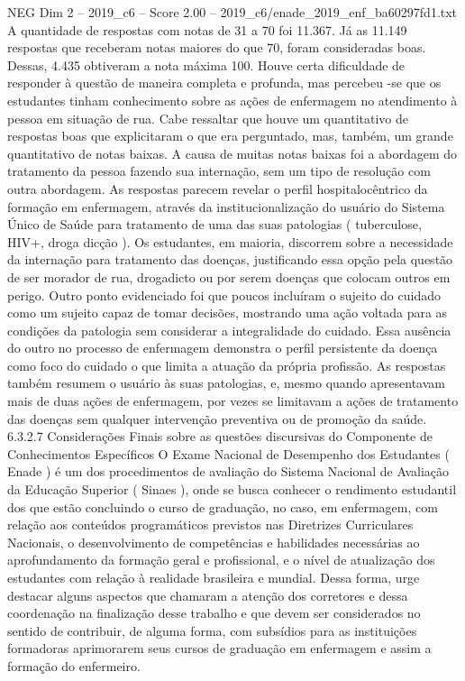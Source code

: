 \begin{textsample}{NEG Dim 2 – 2019\_c6 – Score 2.00 – 2019\_c6/enade\_2019\_enf\_ba60297fd1.txt}
A quantidade de respostas com notas de 31 a 70 foi 11.367.
Já as 11.149 respostas que receberam notas maiores do que 70, foram consideradas boas.
Dessas, 4.435 obtiveram a nota máxima 100.
Houve certa dificuldade de responder à questão de maneira completa e profunda, mas percebeu -se que os estudantes tinham conhecimento sobre as ações de enfermagem no atendimento à pessoa em situação de rua.
Cabe ressaltar que houve um quantitativo de respostas boas que explicitaram o que era perguntado, mas, também, um grande quantitativo de notas baixas.
A causa de muitas notas baixas foi a abordagem do tratamento da pessoa fazendo sua internação, sem um tipo de resolução com outra abordagem.
As respostas parecem revelar o perfil hospitalocêntrico da formação em enfermagem, através da institucionalização do usuário do Sistema Único de Saúde para tratamento de uma das suas patologias ( tuberculose, HIV+, droga dicção ).
Os estudantes, em maioria, discorrem sobre a necessidade da internação para tratamento das doenças, justificando essa opção pela questão de ser morador de rua, drogadicto ou por serem doenças que colocam outros em perigo.
Outro ponto evidenciado foi que poucos incluíram o sujeito do cuidado como um sujeito capaz de tomar decisões, mostrando uma ação voltada para as condições da patologia sem considerar a integralidade do cuidado.
Essa ausência do outro no processo de enfermagem demonstra o perfil persistente da doença como foco do cuidado o que limita a atuação da própria profissão.
As respostas também resumem o usuário às suas patologias, e, mesmo quando apresentavam mais de duas ações de enfermagem, por vezes se limitavam a ações de tratamento das doenças sem qualquer intervenção preventiva ou de promoção da saúde. 6.3.2.7 Considerações Finais sobre as questões discursivas do Componente de Conhecimentos Específicos O Exame Nacional de Desempenho dos Estudantes ( Enade ) é um dos procedimentos de avaliação do Sistema Nacional de Avaliação da Educação Superior ( Sinaes ), onde se busca conhecer o rendimento estudantil dos que estão concluindo o curso de graduação, no caso, em enfermagem, com relação aos conteúdos programáticos previstos nas Diretrizes Curriculares Nacionais, o desenvolvimento de competências e habilidades necessárias ao aprofundamento da formação geral e profissional, e o nível de atualização dos estudantes com relação à realidade brasileira e mundial.
Dessa forma, urge destacar alguns aspectos que chamaram a atenção dos corretores e dessa coordenação na finalização desse trabalho e que devem ser considerados no sentido de contribuir, de alguma forma, com subsídios para as instituições formadoras aprimorarem seus cursos de graduação em enfermagem e assim a formação do enfermeiro.

\end{textsample}
